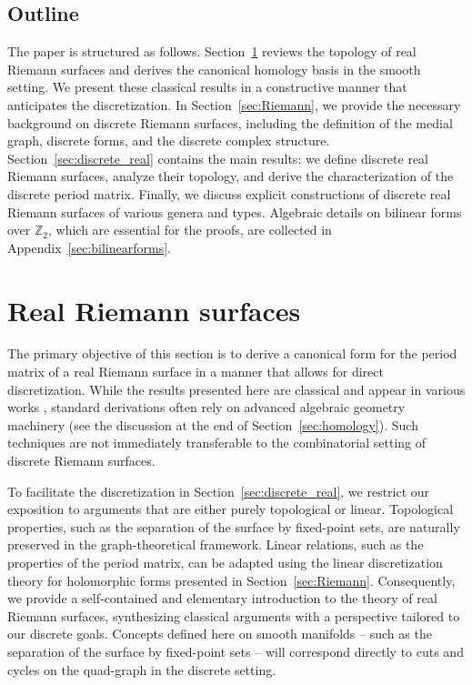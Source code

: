 \documentclass[11pt,a4paper]{article}
\theoremstyle{definition}
\begin{document}
\subsection{Outline}

The paper is structured as follows.
Section~\ref{sec:continuous} reviews the topology of real Riemann surfaces and derives the canonical homology basis in the smooth setting.
We present these classical results in a constructive manner that anticipates the discretization.
In Section~\ref{sec:Riemann}, we provide the necessary background on discrete Riemann surfaces, including the definition of the medial graph, discrete forms, and the discrete complex structure.
Section~\ref{sec:discrete_real} contains the main results: we define discrete real Riemann surfaces, analyze their topology, and derive the characterization of the discrete period matrix.
Finally, we discuss explicit constructions of discrete real Riemann surfaces of various genera and types.
Algebraic details on bilinear forms over $\mathds{Z}_2$, which are essential for the proofs, are collected in Appendix~\ref{sec:bilinearforms}.


\section{Real Riemann surfaces}\label{sec:continuous}

The primary objective of this section is to derive a canonical form for the period matrix of a real Riemann surface in a manner that allows for direct discretization. While the results presented here are classical and appear in various works \cite{Vin93, Wei83, BBEIM94}, standard derivations often rely on advanced algebraic geometry machinery (see the discussion at the end of Section~\ref{sec:homology}). Such techniques are not immediately transferable to the combinatorial setting of discrete Riemann surfaces.

To facilitate the discretization in Section~\ref{sec:discrete_real}, we restrict our exposition to arguments that are either purely topological or linear. Topological properties, such as the separation of the surface by fixed-point sets, are naturally preserved in the graph-theoretical framework. Linear relations, such as the properties of the period matrix, can be adapted using the linear discretization theory for holomorphic forms presented in Section~\ref{sec:Riemann}.
Consequently, we provide a self-contained and elementary introduction to the theory of real Riemann surfaces, synthesizing classical arguments with a perspective tailored to our discrete goals.
Concepts defined here on smooth manifolds -- such as the separation of the surface by fixed-point sets -- will correspond directly to cuts and cycles on the quad-graph in the discrete setting.
\end{document}
